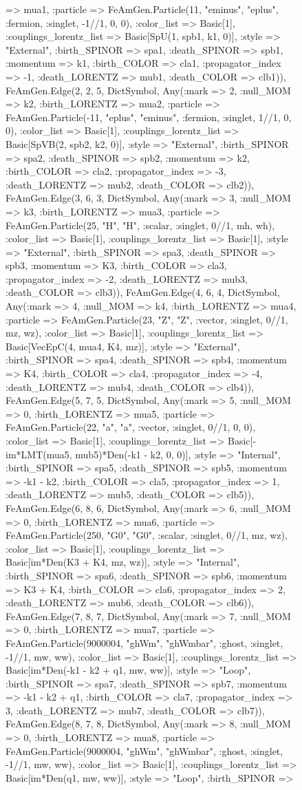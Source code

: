 \documentclass{revtex4}
\begin{document}
\begin{figure}[!htb]
\begin{center}
{=> mua1, :particle => FeAmGen.Particle(11, "eminus", "eplus", :fermion, :singlet, -1//1, 0, 0), :color_list => Basic[1], :couplings_lorentz_list => Basic[SpU(1, spb1, k1, 0)], :style => "External", :birth_SPINOR => spa1, :death_SPINOR => spb1, :momentum => k1, :birth_COLOR => cla1, :propagator_index => -1, :death_LORENTZ => mub1, :death_COLOR => clb1)), FeAmGen.Edge(2, 2, 5, Dict{Symbol, Any}(:mark => 2, :null_MOM => k2, :birth_LORENTZ => mua2, :particle => FeAmGen.Particle(-11, "eplus", "eminus", :fermion, :singlet, 1//1, 0, 0), :color_list => Basic[1], :couplings_lorentz_list => Basic[SpVB(2, spb2, k2, 0)], :style => "External", :birth_SPINOR => spa2, :death_SPINOR => spb2, :momentum => k2, :birth_COLOR => cla2, :propagator_index => -3, :death_LORENTZ => mub2, :death_COLOR => clb2)), FeAmGen.Edge(3, 6, 3, Dict{Symbol, Any}(:mark => 3, :null_MOM => k3, :birth_LORENTZ => mua3, :particle => FeAmGen.Particle(25, "H", "H", :scalar, :singlet, 0//1, mh, wh), :color_list => Basic[1], :couplings_lorentz_list => Basic[1], :style => "External", :birth_SPINOR => spa3, :death_SPINOR => spb3, :momentum => K3, :birth_COLOR => cla3, :propagator_index => -2, :death_LORENTZ => mub3, :death_COLOR => clb3)), FeAmGen.Edge(4, 6, 4, Dict{Symbol, Any}(:mark => 4, :null_MOM => k4, :birth_LORENTZ => mua4, :particle => FeAmGen.Particle(23, "Z", "Z", :vector, :singlet, 0//1, mz, wz), :color_list => Basic[1], :couplings_lorentz_list => Basic[VecEpC(4, mua4, K4, mz)], :style => "External", :birth_SPINOR => spa4, :death_SPINOR => spb4, :momentum => K4, :birth_COLOR => cla4, :propagator_index => -4, :death_LORENTZ => mub4, :death_COLOR => clb4)), FeAmGen.Edge(5, 7, 5, Dict{Symbol, Any}(:mark => 5, :null_MOM => 0, :birth_LORENTZ => mua5, :particle => FeAmGen.Particle(22, "a", "a", :vector, :singlet, 0//1, 0, 0), :color_list => Basic[1], :couplings_lorentz_list => Basic[-im*LMT(mua5, mub5)*Den(-k1 - k2, 0, 0)], :style => "Internal", :birth_SPINOR => spa5, :death_SPINOR => spb5, :momentum => -k1 - k2, :birth_COLOR => cla5, :propagator_index => 1, :death_LORENTZ => mub5, :death_COLOR => clb5)), FeAmGen.Edge(6, 8, 6, Dict{Symbol, Any}(:mark => 6, :null_MOM => 0, :birth_LORENTZ => mua6, :particle => FeAmGen.Particle(250, "G0", "G0", :scalar, :singlet, 0//1, mz, wz), :color_list => Basic[1], :couplings_lorentz_list => Basic[im*Den(K3 + K4, mz, wz)], :style => "Internal", :birth_SPINOR => spa6, :death_SPINOR => spb6, :momentum => K3 + K4, :birth_COLOR => cla6, :propagator_index => 2, :death_LORENTZ => mub6, :death_COLOR => clb6)), FeAmGen.Edge(7, 8, 7, Dict{Symbol, Any}(:mark => 7, :null_MOM => 0, :birth_LORENTZ => mua7, :particle => FeAmGen.Particle(9000004, "ghWm", "ghWmbar", :ghost, :singlet, -1//1, mw, ww), :color_list => Basic[1], :couplings_lorentz_list => Basic[im*Den(-k1 - k2 + q1, mw, ww)], :style => "Loop", :birth_SPINOR => spa7, :death_SPINOR => spb7, :momentum => -k1 - k2 + q1, :birth_COLOR => cla7, :propagator_index => 3, :death_LORENTZ => mub7, :death_COLOR => clb7)), FeAmGen.Edge(8, 7, 8, Dict{Symbol, Any}(:mark => 8, :null_MOM => 0, :birth_LORENTZ => mua8, :particle => FeAmGen.Particle(9000004, "ghWm", "ghWmbar", :ghost, :singlet, -1//1, mw, ww), :color_list => Basic[1], :couplings_lorentz_list => Basic[im*Den(q1, mw, ww)], :style => "Loop", :birth_SPINOR => }
\end{center}
\end{figure}
\end{document}
